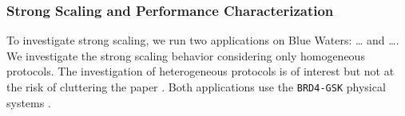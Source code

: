 



\subsubsection{Strong Scaling and Performance Characterization}


To investigate strong scaling, we run two applications on Blue Waters: \ldots
and \ldots {}. We investigate the
strong scaling behavior considering only homogeneous protocols. The
investigation of heterogeneous protocols is of interest but not at the risk
of cluttering the paper . Both applications use the \texttt{BRD4-GSK} physical
systems .

